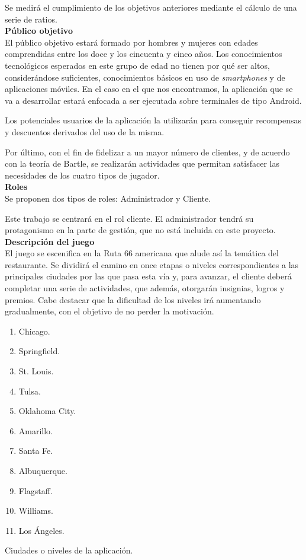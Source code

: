 \documentclass[twoside]{report}
\begin{document}
Se medirá el cumplimiento de los objetivos anteriores mediante el cálculo de una serie de ratios.\\

\textbf{Público objetivo}\\

El público objetivo estará formado por hombres y mujeres con edades comprendidas entre los doce y los cincuenta y cinco años. 
Los conocimientos tecnológicos esperados en este grupo de edad no tienen por qué ser altos, considerándose suficientes, conocimientos básicos en uso de \textit{smartphones} y de aplicaciones móviles. En el caso en el que nos encontramos, la aplicación que se va a desarrollar estará enfocada a ser ejecutada sobre terminales de tipo Android.

Los potenciales usuarios de la aplicación la utilizarán para conseguir recompensas y descuentos derivados del uso de la misma.

Por último, con el fin de fidelizar a un mayor número de clientes, y de acuerdo con la \cite{iebsctj} teoría de Bartle, se realizarán actividades que permitan satisfacer las necesidades de los cuatro tipos de jugador.\\

\textbf{Roles}\\

Se proponen dos tipos de roles: Administrador y Cliente.

Este trabajo se centrará en el rol cliente. El administrador tendrá su protagonismo en la parte de gestión, que no está incluida en este proyecto.\\

\textbf{Descripción del juego}\\

El juego se escenifica en la Ruta 66 americana que alude así la temática del restaurante. Se dividirá el camino en once etapas o niveles correspondientes a las principales ciudades por las que pasa esta vía y, para avanzar, el cliente deberá completar una serie de actividades, que además, otorgarán insignias, logros y premios. Cabe destacar que la dificultad de los niveles irá aumentando gradualmente, con el objetivo de no perder la motivación.

\begin{table}[H]
\begin{multicols}{4}
\begin{enumerate}
\item Chicago.
\item Springfield.
\item St. Louis.
\item Tulsa.
\item Oklahoma City.
\item Amarillo.
\item Santa Fe.
\item Albuquerque.
\item Flagstaff.
\item Williams.
\item Los Ángeles.
\end{enumerate}
\end{multicols}
\caption{Ciudades o niveles de la aplicación.}
\end{table}
\end{document}
